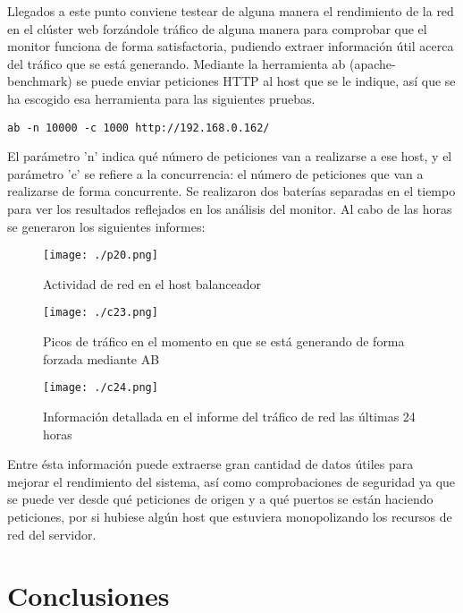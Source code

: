 \documentclass[paper=a4, fontsize=12pt]{scrartcl} %
\begin{document}
Llegados a este punto conviene testear de alguna manera el rendimiento de la red en el clúster web forzándole tráfico de alguna manera para comprobar que el monitor funciona de forma satisfactoria, pudiendo extraer información útil acerca del tráfico que se está generando.
Mediante la herramienta ab (apache-benchmark) se puede enviar peticiones HTTP al host que se le indique, así que se ha escogido esa herramienta para las siguientes pruebas. \cite{p10}

\begin{lstlisting}
ab -n 10000 -c 1000 http://192.168.0.162/
\end{lstlisting}

El parámetro 'n' indica qué número de peticiones van a realizarse a ese host, y el parámetro 'c' se refiere a la concurrencia: el número de peticiones que van a realizarse de forma concurrente.
Se realizaron dos baterías separadas en el tiempo para ver los resultados reflejados en los análisis del monitor.
Al cabo de las horas se generaron los siguientes informes:

\begin{figure}[H] %
	\centering
	\label{lsblk}
	\texttt{[image: ./p20.png]}
	\caption{Actividad de red en el host balanceador} 
\end{figure}

\begin{figure}[H] %
	\centering
	\label{lsblk}
	\texttt{[image: ./c23.png]}
	\caption{Picos de tráfico en el momento en que se está generando de forma forzada mediante AB} 
\end{figure}

\begin{figure}[H] %
	\centering
	\label{lsblk}
	\texttt{[image: ./c24.png]}
	\caption{Información detallada en el informe del tráfico de red las últimas 24 horas} 
\end{figure}

Entre ésta información puede extraerse gran cantidad de datos útiles para mejorar el rendimiento del sistema, así como comprobaciones de seguridad ya que se puede ver desde qué peticiones de origen y a qué puertos se están haciendo peticiones, por si hubiese algún host que estuviera monopolizando los recursos de red del servidor.

\section{Conclusiones}
\end{document}
